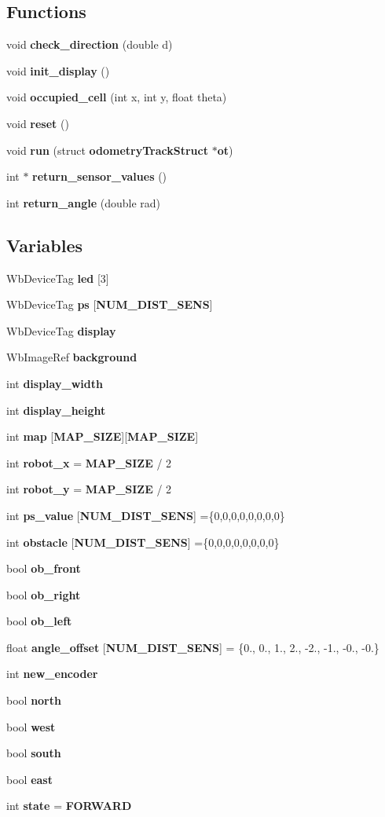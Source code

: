 \subsection*{Functions}
\begin{DoxyCompactItemize}
\item 
void {\bf check\-\_\-direction} (double d)
\item 
void {\bf init\-\_\-display} ()
\item 
void {\bf occupied\-\_\-cell} (int x, int y, float theta)
\item 
void {\bf reset} ()
\item 
void {\bf run} (struct {\bf odometry\-Track\-Struct} $\ast${\bf ot})
\item 
int $\ast$ {\bf return\-\_\-sensor\-\_\-values} ()
\item 
int {\bf return\-\_\-angle} (double rad)
\end{DoxyCompactItemize}
\subsection*{Variables}
\begin{DoxyCompactItemize}
\item 
Wb\-Device\-Tag {\bf led} [3]
\item 
Wb\-Device\-Tag {\bf ps} [{\bf N\-U\-M\-\_\-\-D\-I\-S\-T\-\_\-\-S\-E\-N\-S}]
\item 
Wb\-Device\-Tag {\bf display}
\item 
Wb\-Image\-Ref {\bf background}
\item 
int {\bf display\-\_\-width}
\item 
int {\bf display\-\_\-height}
\item 
int {\bf map} [{\bf M\-A\-P\-\_\-\-S\-I\-Z\-E}][{\bf M\-A\-P\-\_\-\-S\-I\-Z\-E}]
\item 
int {\bf robot\-\_\-x} = {\bf M\-A\-P\-\_\-\-S\-I\-Z\-E} / 2
\item 
int {\bf robot\-\_\-y} = {\bf M\-A\-P\-\_\-\-S\-I\-Z\-E} / 2
\item 
int {\bf ps\-\_\-value} [{\bf N\-U\-M\-\_\-\-D\-I\-S\-T\-\_\-\-S\-E\-N\-S}] =\{0,0,0,0,0,0,0,0\}
\item 
int {\bf obstacle} [{\bf N\-U\-M\-\_\-\-D\-I\-S\-T\-\_\-\-S\-E\-N\-S}] =\{0,0,0,0,0,0,0,0\}
\item 
bool {\bf ob\-\_\-front}
\item 
bool {\bf ob\-\_\-right}
\item 
bool {\bf ob\-\_\-left}
\item 
float {\bf angle\-\_\-offset} [{\bf N\-U\-M\-\_\-\-D\-I\-S\-T\-\_\-\-S\-E\-N\-S}] = \{0., 0., 1., 2., -\/2., -\/1., -\/0., -\/0.\}
\item 
int {\bf new\-\_\-encoder}
\item 
bool {\bf north}
\item 
bool {\bf west}
\item 
bool {\bf south}
\item 
bool {\bf east}
\item 
int {\bf state} = {\bf F\-O\-R\-W\-A\-R\-D}
\end{DoxyCompactItemize}


